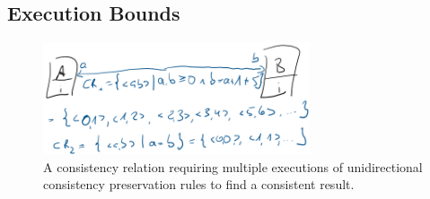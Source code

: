 

\subsection{Execution Bounds} %
\label{chap:synchronization:combination:bounds}

\begin{figure}
    \centering
    \includegraphics[width=0.7\textwidth]{figures/correctness/synchronization/multiple_unidirectional_execution.png}
    \caption[Multiple execution of consistency preservation rules]{A consistency relation requiring multiple executions of unidirectional consistency preservation rules to find a consistent result.}
    \label{fig:synchronization:multiple_unidirectional_execution}
\end{figure}


